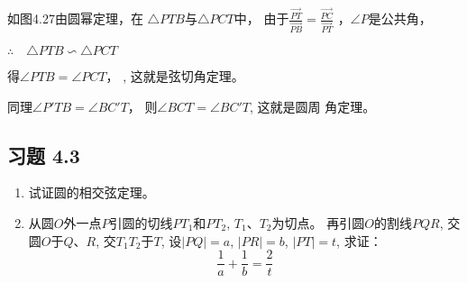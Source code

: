 如图4.27由圆幂定理，在
$\triangle PTB$与$\triangle PCT$中，
由于$\frac{\Vec{PT}}{\Vec{PB}}=\frac{\Vec{PC}}{\Vec{PT}}$
，$\angle P$是公共角，

$\therefore\quad \triangle PTB \backsim \triangle PCT$

得$\angle PTB=\angle PCT$，
, 这就是弦切角定理。

同理$\angle P'TB=\angle BC'T$，
则$\angle BCT=\angle BC'T$, 这就是圆周
角定理。


\subsection*{习题 4.3}
\begin{enumerate}
    \item 试证圆的相交弦定理。
    \item 从圆$O$外一点$P$引圆的切线$PT_1$和$PT_2$, $T_1$、$T_2$为切点。
再引圆$O$的割线$PQR$, 交圆$O$于$Q$、$R$, 交$T_1T_2$于$T$, 
设$|PQ|=a$, $|PR|=b$, $|PT|=t$, 求证：
\[\frac{1}{a}+\frac{1}{b}=\frac{2}{t}\]
\end{enumerate}

